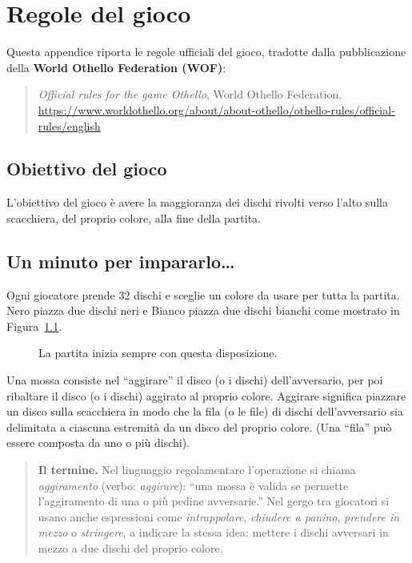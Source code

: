 \chapter{Regole del gioco}

Questa appendice riporta le regole ufficiali del gioco, tradotte dalla
pubblicazione della \textbf{World Othello Federation (WOF)}:

\begin{quote}\small
\emph{Official rules for the game Othello}, World Othello Federation.\\
\url{https://www.worldothello.org/about/about-othello/othello-rules/official-rules/english}
\end{quote}

\section{Obiettivo del gioco}

L'obiettivo del gioco è avere la maggioranza dei dischi rivolti verso l'alto
sulla scacchiera, del proprio colore, alla fine della partita.

\section{Un minuto per impararlo\ldots}

Ogni giocatore prende 32 dischi e sceglie un colore da usare per tutta la
partita. Nero piazza due dischi neri e Bianco piazza due dischi bianchi come
mostrato in Figura~\ref{fig:rules-setup}.

\begin{figure}[htbp]
  \centering
  \caption{La partita inizia sempre con questa disposizione.}
  \label{fig:rules-setup}
\end{figure}

Una mossa consiste nel ``aggirare'' il disco (o i dischi)
dell'avversario, per poi ribaltare il disco (o i dischi) aggirato al
proprio colore. Aggirare significa piazzare un disco sulla scacchiera
in modo che la fila (o le file) di dischi dell'avversario sia delimitata a
ciascuna estremità da un disco del proprio colore. (Una ``fila'' può essere
composta da uno o più dischi).

\begin{quote}\small
\textbf{Il termine.} Nel linguaggio regolamentare l'operazione si chiama
\emph{aggiramento} (verbo: \emph{aggirare}): ``una mossa è valida se permette
l'aggiramento di una o più pedine avversarie.'' Nel gergo tra giocatori si
usano anche espressioni come \emph{intrappolare}, \emph{chiudere a panino},
\emph{prendere in mezzo} o \emph{stringere}, a indicare la stessa idea:
mettere i dischi avversari in mezzo a due dischi del proprio colore.
\end{quote}

